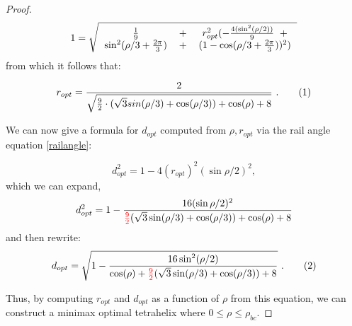 \documentclass[twocolumn,10pt]{asme2ej}
\newcommand\numberthis{\addtocounter{equation}{1}\tag{\theequation}}
\newcommand{\highlighttext}[1] {\textcolor{red}{#1}}
\begin{document}
\begin{proof}
\begin{equation}
  1 =  \sqrt{
    \begin{tabular}{ccc}
    $  \frac{1}{9} $ & + & $ r_{opt}^2(-\frac{4 (\sin^2( \rho / 2))}{9} \; \;+ $\\
$      \sin^2(\rho/3+ \frac{2\pi}{3}) $ & + & $ (1 - \cos(\rho/3 + \frac{2\pi}{3}))^2) $
    \end{tabular}
    }
\end{equation}    
from which it follows that:

\begin{equation}
  r_{opt} = \frac{2}{\sqrt{\frac{9}{2} \cdot ( \sqrt{3} sin(\rho/3) + \cos(\rho/3)) + \cos(\rho)+ 8 }} \text{ .} \numberthis  \label{eqrhoopt}
\end{equation}


We can now give a formula for $ d_{opt} $ computed from $\rho, r_{opt}$ via the rail angle equation \cref{railangle}:

\begin{equation}
  d_{opt}^2 = 1 - 4 (r_{opt})^2 (\sin{ \rho / 2})^2,
\end{equation}
which we can expand,
\begin{equation}
  d_{opt}^2 = 1 - \frac{16(\sin{ \rho / 2})^2}{\highlighttext{\frac{9}{2}} ( \sqrt{3} \sin(\rho/3) + \cos(\rho/3)) + \cos(\rho)+ 8 }    \\
\end{equation}
and then rewrite:
\begin{equation}
    d_{opt} = \sqrt{1 - \frac{16 \sin^2(\rho / 2) }{ \cos(\rho) + \highlighttext{\frac{9}{2}} ( \sqrt{3} \sin(\rho/3) + \cos(\rho/3)) + 8 }}  \text{ .}  \numberthis  \label{dopt}  \\      
\end{equation}



Thus, by computing $r_{opt}$  and $d_{opt}$ as a function of $\rho$ from this equation, we can
construct a minimax optimal tetrahelix where $0 \leq \rho \leq \rho_{bc}$.
\end{proof}
\end{document}
